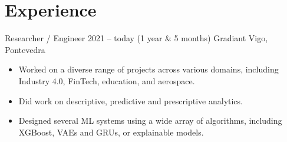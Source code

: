 \documentclass[a4]{article}
\begin{document}

\section*{Experience}
\cvitem
    {Researcher / Engineer}
    {2021 -- today (1 year \& 5 months)}
    {Gradiant}
    {Vigo, Pontevedra}
\begin{itemize}
  \item Worked on a diverse range of projects across various domains,
including Industry 4.0, FinTech, education, and aerospace.\item Did work
on descriptive, predictive and prescriptive analytics.\item Designed
several ML systems using a wide array of algorithms, including XGBoost,
VAEs and GRUs, or explainable models.
\end{itemize}
\end{document}
